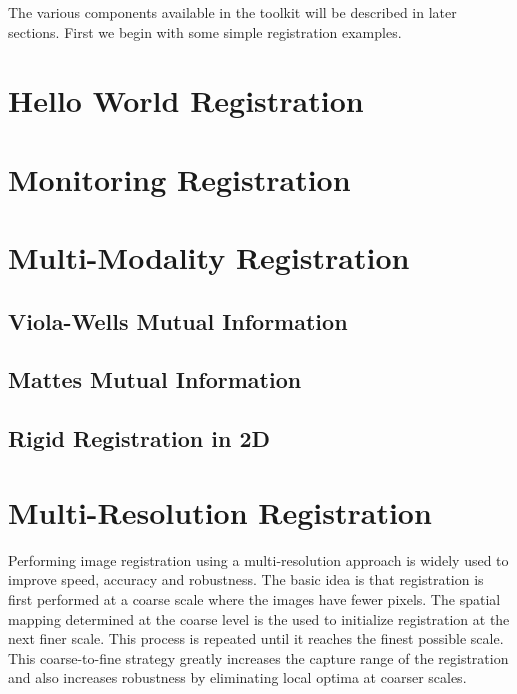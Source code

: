 The various components available in the toolkit will be described in later sections.
First we begin with some simple registration examples.

\section{Hello World Registration}
\label{sec:IntroductionImageRegistration}


\section{Monitoring Registration}
\label{sec:MonitoringImageRegistration}




\section{Multi-Modality Registration}
\label{sec:MultiModalityRegistration}

\subsection{Viola-Wells Mutual Information}
\label{sec:MultiModalityRegistrationViolaWells}


\subsection{Mattes Mutual Information}
\label{sec:MultiModalityRegistrationMattes}


\subsection{Rigid Registration in 2D}
\label{sec:RigidRegistrationIn2D}




\section{Multi-Resolution Registration}
\label{sec:MultiResolutionRegistration}
Performing image registration using a multi-resolution approach is widely used
to improve speed, accuracy and robustness. The basic idea is that registration
is first performed at a coarse scale where the images have fewer pixels.
The spatial mapping determined at the coarse level is the used to initialize
registration at the next finer scale. This process is repeated until it
reaches the finest possible scale. This coarse-to-fine strategy greatly
increases the capture range of the registration and also increases robustness
by eliminating local optima at coarser scales.

